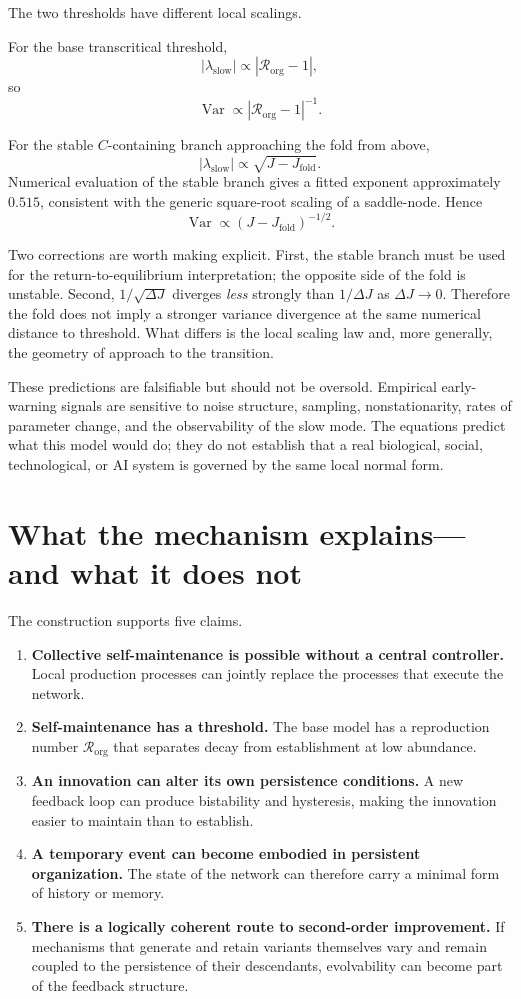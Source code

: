 \documentclass[11pt]{article}
\newcommand{\Rorg}{\mathcal R_{\mathrm{org}}}
\begin{document}
The two thresholds have different local scalings.

For the base transcritical threshold,
\[
|\lambda_{\mathrm{slow}}|\propto |\Rorg-1|,
\]
so
\[
\operatorname{Var}\propto |\Rorg-1|^{-1}.
\]

For the stable $C$-containing branch approaching the fold from above,
\[
|\lambda_{\mathrm{slow}}|
\propto
\sqrt{J-J_{\mathrm{fold}}}.
\]
Numerical evaluation of the stable branch gives a fitted exponent approximately $0.515$, consistent with the generic square-root scaling of a saddle-node. Hence
\[
\operatorname{Var}
\propto
(J-J_{\mathrm{fold}})^{-1/2}.
\]

Two corrections are worth making explicit. First, the stable branch must be used for the return-to-equilibrium interpretation; the opposite side of the fold is unstable. Second, $1/\sqrt{\Delta J}$ diverges \emph{less} strongly than $1/\Delta J$ as $\Delta J\to0$. Therefore the fold does not imply a stronger variance divergence at the same numerical distance to threshold. What differs is the local scaling law and, more generally, the geometry of approach to the transition.

These predictions are falsifiable but should not be oversold. Empirical early-warning signals are sensitive to noise structure, sampling, nonstationarity, rates of parameter change, and the observability of the slow mode. The equations predict what this model would do; they do not establish that a real biological, social, technological, or AI system is governed by the same local normal form.

\section{What the mechanism explains---and what it does not}

The construction supports five claims.

\begin{enumerate}[label=\arabic*.]
\item \textbf{Collective self-maintenance is possible without a central controller.} Local production processes can jointly replace the processes that execute the network.
\item \textbf{Self-maintenance has a threshold.} The base model has a reproduction number $\Rorg$ that separates decay from establishment at low abundance.
\item \textbf{An innovation can alter its own persistence conditions.} A new feedback loop can produce bistability and hysteresis, making the innovation easier to maintain than to establish.
\item \textbf{A temporary event can become embodied in persistent organization.} The state of the network can therefore carry a minimal form of history or memory.
\item \textbf{There is a logically coherent route to second-order improvement.} If mechanisms that generate and retain variants themselves vary and remain coupled to the persistence of their descendants, evolvability can become part of the feedback structure.
\end{enumerate}
\end{document}
